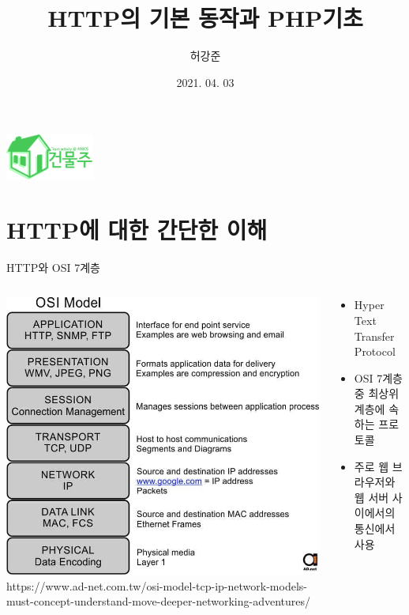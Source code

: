 \documentclass{beamer}
\title{HTTP의 기본 동작과 PHP기초}
\author{허강준}
\institute{충남대학교 정보보호동아리 ARGOS}
\date{2021. 04. 03}
\begin{document}
\begin{frame}
    \begin{center}
        \includegraphics[height=1.5cm]{../Images/logo.png}
    \end{center}

    \maketitle
\end{frame}

\section{HTTP에 대한 간단한 이해}
    \begin{frame}{HTTP와 OSI 7계층}
        \begin{columns}
            \begin{column}{.4\textwidth}
                \includegraphics[width=\linewidth]{Images/osi.jpg}
                \tiny{https://www.ad-net.com.tw/osi-model-tcp-ip-network-models-must-concept-understand-move-deeper-networking-adventures/}
            \end{column}
            \begin{column}{.6\textwidth}
                \begin{itemize}
                    \item Hyper Text Transfer Protocol
                    \item OSI 7계층중 최상위 계층에 속하는 프로토콜
                    \item 주로 웹 브라우저와 웹 서버 사이에서의 통신에서 사용
                \end{itemize} 
            \end{column}
        \end{columns}
    \end{frame}
\end{document}
